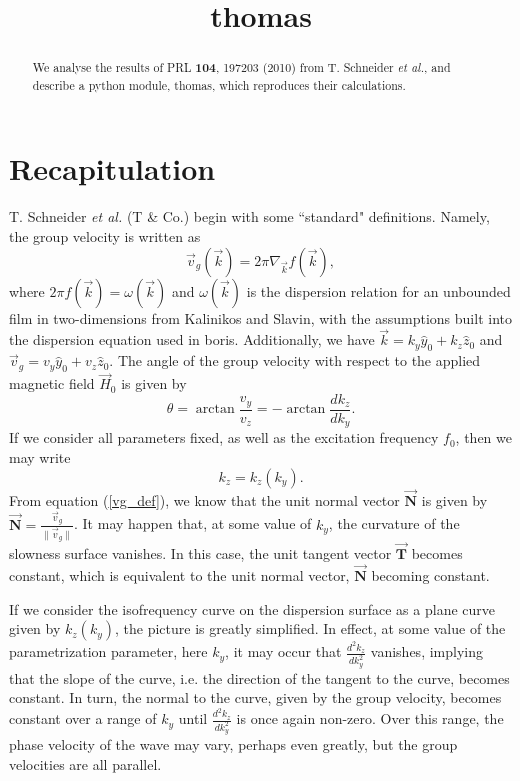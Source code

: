 \documentclass{article}
\title{thomas}
\begin{document}
\maketitle
\begin{abstract}
We analyse the results of PRL \textbf{104}, 197203 (2010) from T. Schneider \textit{et al.}, and describe a python module, thomas, which reproduces their calculations.
\end{abstract}
\section{Recapitulation}
T. Schneider \textit{et al.} (T \& Co.) begin with some ``standard" definitions. Namely, the group velocity is written as
\begin{equation}\label{vg_def}
\vec{v}_{g} (\vec{k}) = 2 \pi \nabla_{\vec{k}} f(\vec{k}),
\end{equation}
where $2 \pi f (\vec{k}) = \omega (\vec{k})$ and $\omega (\vec{k})$ is the dispersion relation for an unbounded film in two-dimensions from Kalinikos and Slavin, with the assumptions built into the dispersion equation used in boris. Additionally, we have $\vec{k} = k_{y} \hat{y}_{0} + k_{z} \hat{z}_{0}$ and $\vec{v}_{g} = v_{y} \hat{y}_{0} + v_{z} \hat{z}_{0}$. The angle of the group velocity with respect to the applied magnetic field $\vec{H}_{0}$ is given by
\begin{equation}\label{vg_angle}
\theta = \arctan{\frac{v_{y}}{v_{z}}} = - \arctan{\frac{d k_{z}}{d k_{y}}}.
\end{equation}
If we consider all parameters fixed, as well as the excitation frequency $f_{0}$, then we may write
\begin{equation}
k_{z} = k_{z} (k_{y}).
\end{equation}
From equation (\ref{vg_def}), we know that the unit normal vector $\vec{\textbf{N}}$ is given by $\vec{\textbf{N}} = \frac{\vec{v}_{g}}{\| \vec{v}_{g} \|}$. It may happen that, at some value of $k_{y}$, the curvature of the slowness surface vanishes. In this case, the unit tangent vector $\vec{\textbf{T}}$ becomes constant, which is equivalent to the unit normal vector, $\vec{\textbf{N}}$ becoming constant. 

If we consider the isofrequency curve on the dispersion surface as a plane curve given by $k_{z} ( k_{y} )$, the picture is greatly simplified. In effect, at some value of the parametrization parameter, here $k_{y}$, it may occur that $\frac{d^2 k_{z}}{d k_{y}^2}$ vanishes, implying that the slope of the curve, i.e. the direction of the tangent to the curve, becomes constant. In turn, the normal to the curve, given by the group velocity, becomes constant over a range of $k_{y}$ until $\frac{d^2 k_{z}}{d k_{y}^2}$ is once again non-zero. Over this range, the phase velocity of the wave may vary, perhaps even greatly, but the group velocities are all parallel.
\end{document}
